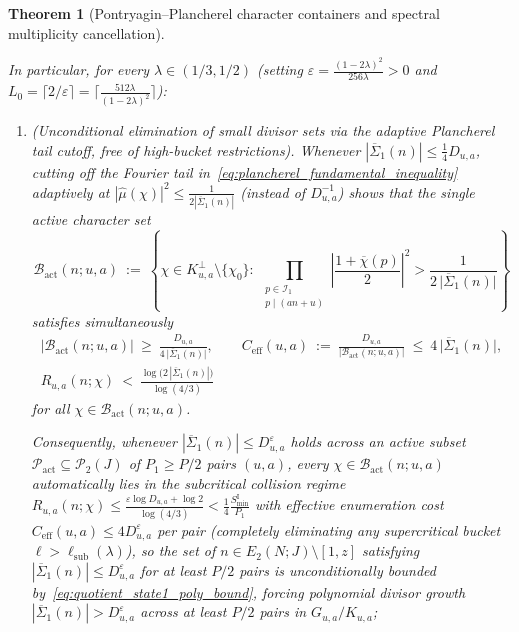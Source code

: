 \documentclass[11pt, a4paper]{article}
\theoremstyle{plain}
\newtheorem{theorem}{Theorem}[section]
\theoremstyle{definition}
\begin{document}
\begin{theorem}[Pontryagin--Plancherel character containers and spectral multiplicity cancellation]
\begin{enumerate}[label=(\alph*)]
    In particular, for every $\lambda\in(1/3,1/2)$ (setting $\varepsilon=\frac{(1-2\lambda)^{2}}{256\lambda}>0$ and $L_0=\lceil 2/\varepsilon\rceil=\lceil\frac{512\lambda}{(1-2\lambda)^{2}}\rceil$):
    \begin{enumerate}[label=(\roman*)]
        \item \emph{(Unconditional elimination of small divisor sets via the adaptive Plancherel tail cutoff, free of high-bucket restrictions).} 
        Whenever $|\overline{\Sigma}_1(n)|\le\frac14 D_{u,a}$, cutting off the Fourier tail in~\eqref{eq:plancherel_fundamental_inequality} adaptively at $|\widehat{\mu}(\chi)|^{2}\le\frac{1}{2|\overline{\Sigma}_1(n)|}$ (instead of $D_{u,a}^{-1}$) shows that the single active character set
        \begin{equation}\label{eq:adaptive_active_char_set}
        \mathcal{B}_{\mathrm{act}}(n;u,a)\ :=\ \left\{\chi\in K_{u,a}^{\perp}\setminus\{\chi_0\}:\ \prod_{\substack{p\in\mathcal{I}_1\\ p\mid(an+u)}}\left|\frac{1+\overline{\chi}(p)}{2}\right|^{2}>\frac{1}{2\,\big|\overline{\Sigma}_1(n)\big|}\right\}
        \end{equation}
        satisfies simultaneously
        \begin{equation}\label{eq:adaptive_multiplicity_and_collision}
        \begin{gathered}
        \big|\mathcal{B}_{\mathrm{act}}(n;u,a)\big|\ \ge\ \frac{D_{u,a}}{4\,\big|\overline{\Sigma}_1(n)\big|},\qquad C_{\mathrm{eff}}(u,a)\ :=\ \frac{D_{u,a}}{\big|\mathcal{B}_{\mathrm{act}}(n;u,a)\big|}\ \le\ 4\,\big|\overline{\Sigma}_1(n)\big|,\\
        R_{u,a}(n;\chi)\ <\ \frac{\log\big(2\,|\overline{\Sigma}_1(n)|\big)}{\log(4/3)}
        \end{gathered}
        \end{equation}
        for all $\chi\in\mathcal{B}_{\mathrm{act}}(n;u,a)$. 
        
        Consequently, whenever $|\overline{\Sigma}_1(n)|\le D_{u,a}^{\varepsilon}$ holds across an active subset $\mathcal{P}_{\mathrm{act}}\subseteq\mathcal{P}_2(J)$ of $P_1\ge P/2$ pairs $(u,a)$, \emph{every} $\chi\in\mathcal{B}_{\mathrm{act}}(n;u,a)$ automatically lies in the subcritical collision regime $R_{u,a}(n;\chi)\le\allowbreak\frac{\varepsilon\log D_{u,a}+\log 2}{\log(4/3)}<\allowbreak\frac14\frac{S_{\min}^{\mathrm{I}}}{P_1}$ with effective enumeration cost $C_{\mathrm{eff}}(u,a)\le 4 D_{u,a}^{\varepsilon}$ per pair (completely eliminating any supercritical bucket $\ell>\ell_{\mathrm{sub}}(\lambda)$), so the set of $n\in E_2(N;J)\setminus[1,z]$ satisfying $|\overline{\Sigma}_1(n)|\le D_{u,a}^{\varepsilon}$ for at least $P/2$ pairs is unconditionally bounded by~\eqref{eq:quotient_state1_poly_bound}, forcing polynomial divisor growth $|\overline{\Sigma}_1(n)|>D_{u,a}^{\varepsilon}$ across at least $P/2$ pairs in $G_{u,a}/K_{u,a}$;
        

\end{enumerate}
\end{enumerate}
\end{theorem}
\end{document}

